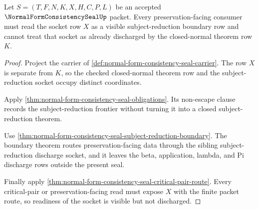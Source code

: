 \begin{theorem}
\label{thm:normal-form-consistency-seal-subject-reduction-socket-readiness}
Let $S=(T,F,N,K,X,H,C,P,L)$ be an accepted $\NormalFormConsistencySealUp$
packet. Every preservation-facing consumer must read the socket row $X$ as a
visible subject-reduction boundary row and cannot treat that socket as already
discharged by the closed-normal theorem row $K$.
\end{theorem}
\begin{proof}
Project the carrier of
\autoref{def:normal-form-consistency-seal-carrier}. The row $X$ is separate
from $K$, so the checked closed-normal theorem row and the subject-reduction
socket occupy distinct coordinates.

Apply \autoref{thm:normal-form-consistency-seal-obligations}. Its non-escape
clause records the subject-reduction frontier without turning it into a closed
subject-reduction theorem.

Use \autoref{thm:normal-form-consistency-seal-subject-reduction-boundary}.
The boundary theorem routes preservation-facing data through the sibling
subject-reduction discharge socket, and it leaves the beta, application,
lambda, and Pi discharge rows outside the present seal.

Finally apply \autoref{thm:normal-form-consistency-seal-critical-pair-route}.
Every critical-pair or preservation-facing read must expose $X$ with the
finite packet route, so readiness of the socket is visible but not discharged.
\end{proof}

